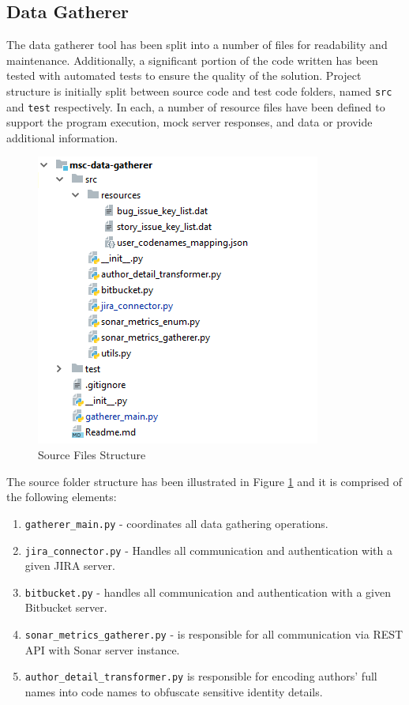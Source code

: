 \subsection{Data Gatherer}\label{sec:impl-data-gatherer}
The data gatherer tool has been split into a number of files for readability and maintenance. Additionally, a significant portion of the code written has been tested with automated tests to ensure the quality of the solution. Project structure is initially split between source code and test code folders, named \texttt{src} and \texttt{test} respectively. In each, a number of resource files have been defined to support the program execution, mock server responses, and data or provide additional information.

\begin{figure}[!h]
    \centering
    \includegraphics{Figures/impl_src_folder_files.png}
    \caption{Source Files Structure}
    \label{fig:impl-data-gatherer-source-files}
\end{figure}

The source folder structure has been illustrated in Figure \ref{fig:impl-data-gatherer-source-files} and it is comprised of the following elements:
\begin{enumerate}
    \item \texttt{gatherer\_main.py} - coordinates all data gathering operations. 
    \item\label{lst:impl.item:jira} \texttt{jira\_connector.py} - Handles all communication and authentication with a given JIRA server.
    \item\label{lst:impl.item:bitbucket} \texttt{bitbucket.py} - handles all communication and authentication with a given Bitbucket server.
    \item\label{lst:impl.item:sonar-metrics-gatherer} \texttt{sonar\_metrics\_gatherer.py} - is responsible for all communication via REST API with Sonar server instance.
    \item\label{lst:impl.item:author-encoder} \texttt{author\_detail\_transformer.py} is responsible for encoding authors' full names into code names to obfuscate sensitive identity details. 
\end{enumerate}

